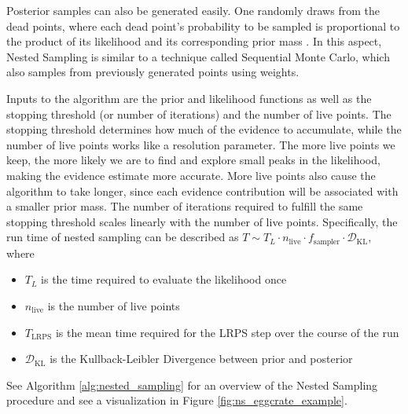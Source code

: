 \documentclass[12pt, a4paper]{report}
\begin{document}
Posterior samples can also be generated easily.
One randomly draws from the dead points, where each dead point's probability to be sampled is proportional to the product of its likelihood and its corresponding prior mass \cite[9]{nested_sampling_talk}.
In this aspect, Nested Sampling is similar to a technique called Sequential Monte Carlo, which also samples from previously generated points using weights.

Inputs to the algorithm are the prior and likelihood functions as well as the stopping threshold (or number of iterations) and the number of live points.
The stopping threshold determines how much of the evidence to accumulate, while the number of live points works like a resolution parameter.
The more live points we keep, the more likely we are to find and explore small peaks in the likelihood, making the evidence estimate more accurate.
More live points also cause the algorithm to take longer, since each evidence contribution will be associated with a smaller prior mass.
The number of iterations required to fulfill the same stopping threshold scales linearly with the number of live points.
Specifically, the run time of nested sampling can be described as $T \sim T_L \cdot n_{\textrm{live}} \cdot f_{\textrm{sampler}} \cdot \mathcal{D}_{\textrm{KL}}$, where
\begin{itemize}
    \item $T_L$ is the time required to evaluate the likelihood once
    \item $n_{\textrm{live}}$ is the number of live points
    \item $T_{\textrm{LRPS}}$ is the mean time required for the LRPS step over the course of the run
    \item $\mathcal{D}_{\textrm{KL}}$ is the Kullback-Leibler Divergence between prior and posterior \cite[1]{nested_sampling_talk}
\end{itemize}
See Algorithm \ref{alg:nested_sampling} for an overview of the Nested Sampling procedure and see a visualization in Figure \ref{fig:ns_eggcrate_example}.
\end{document}

